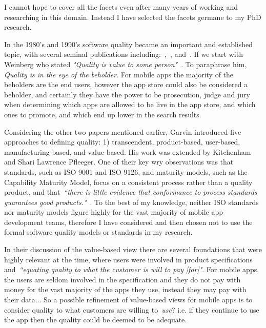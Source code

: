 I cannot hope to %
cover all the facets even after many years of working and researching in this domain. Instead I have selected the facets germane to my PhD research.

In the 1980's and 1990's software quality became an important and established topic, with several seminal publications including:~\citep{garvin1984_what_does_product_quality_really_mean},~\citep{weinberg1992quality}, and~\citep{kitchenham1996_software_quality_elusive_target}. If we start with Weinberg who stated \emph{"Quality is value to some person"}~\cite{weinberg1992quality}. To paraphrase him, \emph{Quality is in the eye of the beholder}. For mobile apps the majority of the beholders are the end users, however the app store could also be considered a beholder, and certainly they have the power to be prosecution, judge and jury when determining which apps are allowed to be live in the app store, and which ones to promote, and which end up lower in the search results.

Considering the other two papers mentioned earlier, Garvin introduced five approaches to defining quality: 1) transcendent, product-based, user-based, manufacturing-based, and value-based. His work was extended by Kitchenham and Shari Lawrence Pfleeger. One of their key wry observations was that standards, such as ISO 9001 and ISO 9126, and maturity models, such as the Capability Maturity Model, focus on a consistent process rather than a quality product, and that~\emph{``there is little evidence that conformance to process standards guarantees good products."}~\citep{kitchenham1996_software_quality_elusive_target}. To the best of my knowledge, neither ISO standards nor maturity models figure highly for the vast majority of mobile app development teams, therefore I have considered and then chosen not to use the formal software quality models or standards in my research. 

In their discussion of the value-based view there are several foundations that were highly relevant at the time, where users were involved in product specifications and~\emph{``equating quality to what the customer is will to pay [for]"}. For mobile apps, the users are seldom involved in the specification and they do not pay with money for the vast majority of the apps they use, instead they may pay with their data... So a possible refinement of value-based views for mobile apps is to consider quality to what customers are willing to~\emph{use}? i.e. if they continue to use the app then the quality could be deemed to be adequate.

